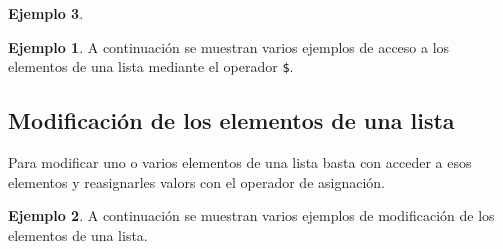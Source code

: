 \documentclass[
]{book}
\newenvironment{Shaded}{\begin{snugshade}}{\end{snugshade}}
\newcommand{\CommentTok}[1]{\textcolor[rgb]{0.56,0.35,0.01}{\textit{#1}}}
\newcommand{\DecValTok}[1]{\textcolor[rgb]{0.00,0.00,0.81}{#1}}
\newcommand{\FunctionTok}[1]{\textcolor[rgb]{0.00,0.00,0.00}{#1}}
\newcommand{\NormalTok}[1]{#1}
\newcommand{\OtherTok}[1]{\textcolor[rgb]{0.56,0.35,0.01}{#1}}
\newcommand{\SpecialCharTok}[1]{\textcolor[rgb]{0.00,0.00,0.00}{#1}}
\newcommand{\StringTok}[1]{\textcolor[rgb]{0.31,0.60,0.02}{#1}}
\theoremstyle{definition}
\theoremstyle{definition}
\newtheorem{example}{Ejemplo}[chapter]
\theoremstyle{definition}
\theoremstyle{definition}
\theoremstyle{remark}
\begin{document}
\begin{example}
\begin{example}

A continuación se muestran varios ejemplos de acceso a los elementos de una lista mediante el operador \texttt{\$}.

\begin{Shaded}
\end{Shaded}

\end{example}

\hypertarget{modificaciuxf3n-de-los-elementos-de-una-lista}{%
\subsection{Modificación de los elementos de una lista}\label{modificaciuxf3n-de-los-elementos-de-una-lista}}

Para modificar uno o varios elementos de una lista basta con acceder a esos elementos y reasignarles valors con el operador de asignación.

\begin{example}

A continuación se muestran varios ejemplos de modificación de los elementos de una lista.

\begin{Shaded}
\end{Shaded}


\end{example}
\end{example}
\end{document}
